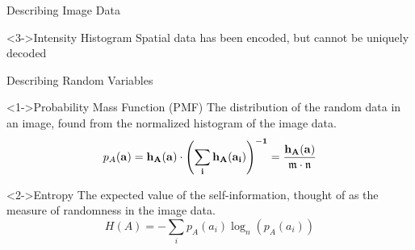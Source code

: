 \documentclass{beamer}
\begin{document}
\begin{frame}[c]{\sc Describing Image Data}

\begin{figure}
\centering
{}
\pause
{}
\label{infoTheory2}
\end{figure}

\begin{block}<3->{Intensity Histogram}
Spatial data has been encoded, but cannot be uniquely decoded
\end{block}


\end{frame}


\begin{frame}[c]{\sc Describing Random Variables}


\begin{block}<1->{Probability Mass Function (PMF)}
The distribution of the random data in an image, found from the normalized histogram of the image data.
\begin{equation}
\label{PMF}
	p_{A}(\bf{a})=h_{A}(\bf{a}) \cdot \left(\sum_{i}{h_{A}(a_{i})} \right)^{-1} = \frac{h_{A}(\bf{a})}{\mathfrak{m}\cdot\mathfrak{n}}
\end{equation}
\end{block}

\vfill

\begin{block}<2->{Entropy}
The expected value of the self-information, thought of as the measure of randomness in the image data.
\begin{equation}
\label{entropy}
	H(A) = - \sum_{i}{p_{A}(a_{i}) \log_{n}{\left(p_{A}(a_{i})\right)}}
\end{equation}
\end{block}

\end{frame}
\end{document}
